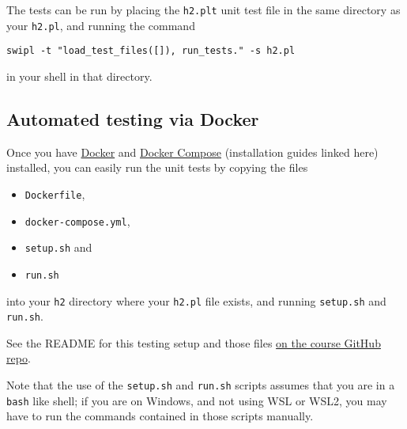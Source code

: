 \documentclass[11pt]{article}
\begin{document}
The tests can be run by placing the \texttt{h2.plt} unit test file
in the same directory as your \texttt{h2.pl}, and running the command
\begin{verbatim}
swipl -t "load_test_files([]), run_tests." -s h2.pl
\end{verbatim}
in your shell in that directory.

\subsection*{Automated testing via Docker}
\label{sec:org58ac8a6}
Once you have \href{https://docs.docker.com/get-docker/}{Docker}
and \href{https://docs.docker.com/compose/install/}{Docker Compose}
(installation guides linked here)
installed, you can easily run the unit tests
by copying the files
\begin{itemize}
\item \texttt{Dockerfile},
\item \texttt{docker-compose.yml},
\item \texttt{setup.sh} and
\item \texttt{run.sh}
\end{itemize}
into your \texttt{h2} directory where your \texttt{h2.pl} file exists,
and running \texttt{setup.sh} and \texttt{run.sh}.

See the README for this testing setup and those files
\href{https://github.com/armkeh/principles-of-programming-languages/tree/master/homework/testing/h2}{on the course GitHub repo}.

Note that the use of the \texttt{setup.sh} and \texttt{run.sh} scripts assumes
that you are in a \texttt{bash} like shell; if you are on Windows,
and not using WSL or WSL2, you may have
to run the commands contained in those scripts manually.
\end{document}
